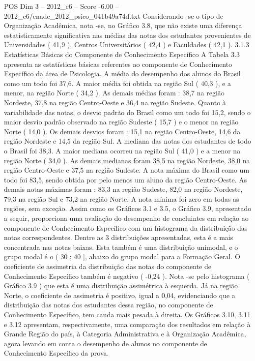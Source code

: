 \begin{textsample}{POS Dim 3 – 2012\_c6 – Score -6.00 – 2012\_c6/enade\_2012\_psico\_041b49a74d.txt}
Considerando -se o tipo de Organização Acadêmica, nota -se, no Gráfico 3.8, que não existe uma diferença estatisticamente significativa nas médias das notas dos estudantes provenientes de Universidades ( 41,9 ), Centros Universitários ( 42,4 ) e Faculdades ( 42,1 ). 3.1.3 Estatísticas Básicas do Componente de Conhecimento Específico A Tabela 3.3 apresenta as estatísticas básicas referentes ao componente de Conhecimento Específico da área de Psicologia.
A média do desempenho dos alunos do Brasil como um todo foi 37,6.
A maior média foi obtida na região Sul ( 40,3 ), e a menor, na região Norte ( 34,2 ).
As demais médias foram : 38,7 na região Nordeste, 37,8 na região Centro-Oeste e 36,4 na região Sudeste.
Quanto à variabilidade das notas, o desvio padrão do Brasil como um todo foi 15,2, sendo o maior desvio padrão observado na região Sudeste ( 15,7 ) e o menor na região Norte ( 14,0 ).
Os demais desvios foram : 15,1 na região Centro-Oeste, 14,6 da região Nordeste e 14,5 da região Sul.
A mediana das notas dos estudantes de todo o Brasil foi 38,3.
A maior mediana ocorreu na região Sul ( 41,0 ) e a menor na região Norte ( 34,0 ).
As demais medianas foram 38,5 na região Nordeste, 38,0 na região Centro-Oeste e 37,5 na região Sudeste.
A nota máxima do Brasil como um todo foi 83,5, sendo obtida por pelo menos um aluno da região Centro-Oeste.
As demais notas máximas foram : 83,3 na região Sudeste, 82,0 na região Nordeste, 79,3 na região Sul e 73,2 na região Norte.
A nota mínima foi zero em todas as regiões, sem exceção.
Assim como os Gráficos 3.1 e 3.5, o Gráfico 3.9, apresentado a seguir, proporciona uma avaliação do desempenho de concluintes em relação ao componente de Conhecimento Específico com um histograma da distribuição das notas correspondentes.
Dentre as 3 distribuições apresentadas, esta é a mais concentrada nas notas baixas.
Esta também é uma distribuição unimodal, e o grupo modal é o ( 30 ; 40 ], abaixo do grupo modal para a Formação Geral.
O coeficiente de assimetria da distribuição das notas do componente de Conhecimento Específico também é negativo ( -0,24 ).
Nota -se pelo histograma ( Gráfico 3.9 ) que esta é uma distribuição assimétrica à esquerda.
Já na região Norte, o coeficiente de assimetria é positivo, igual a 0,04, evidenciando que a distribuição das notas dos estudantes dessa região, no componente de Conhecimento Específico, tem cauda mais pesada à direita.
Os Gráficos 3.10, 3.11 e 3.12 apresentam, respectivamente, uma comparação dos resultados em relação à Grande Região do país, à Categoria Administrativa e à Organização Acadêmica, agora levando em conta o desempenho de alunos no componente de Conhecimento Específico da prova.

\end{textsample}
